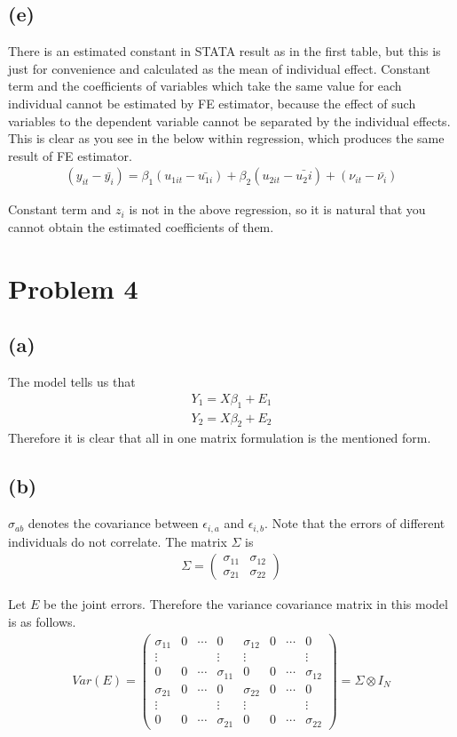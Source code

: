 \documentclass{article}
\begin{document}
\subsection{(e)}
There is an estimated constant in STATA result as in the first table, but this is just for convenience and calculated as the mean of individual effect. Constant term and the coefficients of variables which take the same value for each individual cannot be estimated by FE estimator, because the effect of such variables to the dependent variable cannot be separated by the individual effects. This is clear as you see in the below within regression, which produces the same result of FE estimator.
\begin{align*}
	(y_{it} - \bar{y_i}) = \beta_1 (u_{1it} - \bar{u_{1i}}) + \beta_2 (u_{2it} - \bar{u_2i}) + (\nu_{it} - \bar{\nu_i})
\end{align*}

Constant term and $z_i$ is not in the above regression, so it is natural that you cannot obtain the estimated coefficients of them.


\section{Problem 4}
\subsection{(a)}
The model tells us that
\begin{align*}
	Y_1 = X\beta_1 + E_1\\
	Y_2 = X\beta_2 + E_2
\end{align*}
Therefore it is clear that all in one matrix formulation is the mentioned form.

\subsection{(b)}
$\sigma_{ab}$ denotes the covariance between $\epsilon_{i,a}$ and $\epsilon_{i, b}$. Note that the errors of different individuals do not correlate. The matrix $\Sigma$ is
\begin{align*}
\Sigma = \begin{pmatrix}
\sigma_{11} & \sigma_{12}\\
\sigma_{21} & \sigma_{22}
\end{pmatrix}
\end{align*}

 Let $E$ be the joint errors. Therefore the variance covariance matrix in this model is as follows.
\begin{align*}
	Var\left(E \right) = \begin{pmatrix}\sigma_{11}& 0& \cdots& 0&\sigma_{12}&0 &\cdots & 0\\
	\vdots&&&\vdots&\vdots&&&\vdots\\
	0&0&\cdots&\sigma_{11}&0&0&\cdots&\sigma_{12}\\
	\sigma_{21}& 0& \cdots& 0&\sigma_{22}&0 &\cdots & 0\\
	\vdots&&&\vdots&\vdots&&&\vdots\\
	0&0&\cdots&\sigma_{21}&0&0&\cdots&\sigma_{22}
	\end{pmatrix}
	=\Sigma \otimes I_N
\end{align*}
\end{document}
